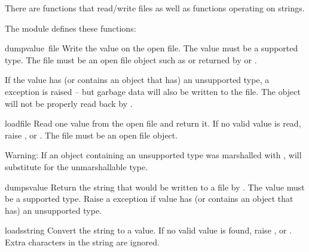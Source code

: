 There are functions that read/write files as well as functions
operating on strings.

The module defines these functions:


\begin{funcdesc}{dump}{value\, file}
  Write the value on the open file.  The value must be a supported
  type.  The file must be an open file object such as
   or returned by  or
  .
  
  If the value has (or contains an object that has) an unsupported type,
  a  exception is raised -- but garbage data will also
  be written to the file.  The object will not be properly read back by
  .
\end{funcdesc}

\begin{funcdesc}{load}{file}
  Read one value from the open file and return it.  If no valid value
  is read, raise ,  or
  .  The file must be an open file object.

  Warning: If an object containing an unsupported type was marshalled
  with ,  will substitute  for the
  unmarshallable type.
\end{funcdesc}

\begin{funcdesc}{dumps}{value}
  Return the string that would be written to a file by
  .  The value must be a supported type.
  Raise a  exception if value has (or contains an
  object that has) an unsupported type.
\end{funcdesc}

\begin{funcdesc}{loads}{string}
  Convert the string to a value.  If no valid value is found, raise
  ,  or .  Extra
  characters in the string are ignored.
\end{funcdesc}

